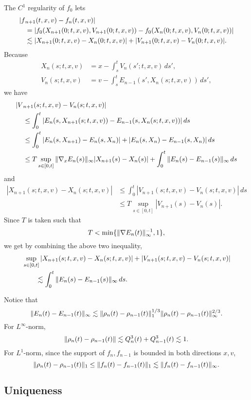 \documentclass[11pt]{amsart}
\begin{document}
\begin{pfs}
The $C^1$ regularity of $f_0$ lets
\begin{align*}
|f&_{n+1}(t,x,v)-f_n(t,x,v)|\\
&=|f_0(X_{n+1}(0;t,x,v),V_{n+1}(0;t,x,v))-f_0(X_n(0;t,x,v),V_n(0;t,x,v))|\\
&\lesssim|X_{n+1}(0;t,x,v)-X_n(0;t,x,v)|+|V_{n+1}(0;t,x,v)-V_n(0;t,x,v)|.
\end{align*}
Because
\begin{align*}
X_n(s;t,x,v)&=x-\int_s^tV_n(s';t,x,v)\,ds',\\
V_n(s;t,x,v)&=v-\int_s^tE_{n-1}(s',X_n(s;t,x,v))\,ds',
\end{align*}
we have
\begin{align*}
|V&_{n+1}(s;t,x,v)-V_n(s;t,x,v)|\\
&\le\int_0^t|E_n(s,X_{n+1}(s;t,x,v))-E_{n-1}(s,X_n(s;t,x,v))|\,ds\\
&\le\int_0^t|E_n(s,X_{n+1})-E_n(s,X_n)|+|E_n(s,X_n)-E_{n-1}(s,X_n)|\,ds\\
&\le T\sup_{s\in[0,t]}\|\nabla_xE_n(s)\|_\infty|X_{n+1}(s)-X_n(s)|+\int_0^t\|E_n(s)-E_{n-1}(s)\|_\infty\,ds
\end{align*}
and
\begin{align*}
|X_{n+1}(s;t,x,v)-X_n(s;t,x,v)|
&\le\int_0^t|V_{n+1}(s;t,x,v)-V_n(s;t,x,v)|\,ds\\
&\le T\sup_{s\in[0,t]}|V_{n+1}(s)-V_n(s)|.
\end{align*}
Since $T$ is taken such that
\[T<\min\{\|\nabla E_n(t)\|_\infty^{-1},1\},\]
we get by combining the above two inequality,
\begin{align*}
&\sup_{s\in[0,t]}|X_{n+1}(s;t,x,v)-X_n(s;t,x,v)|+|V_{n+1}(s;t,x,v)-V_n(s;t,x,v)|\\
&\qquad\lesssim\int_0^t\|E_n(s)-E_{n-1}(s)\|_\infty\,ds.
\end{align*}
\item
Notice that
\[\|E_n(t)-E_{n-1}(t)\|_\infty\lesssim\|\rho_n(t)-\rho_{n-1}(t)\|_1^{1/3}\|\rho_n(t)-\rho_{n-1}(t)\|_\infty^{2/3}.\]
For $L^\infty$-norm,
\[\|\rho_n(t)-\rho_{n-1}(t)\|\lesssim Q_n^3(t)+Q_{n-1}^3(t)\lesssim1.\]
For $L^1$-norm, since the support of $f_n,f_{n-1}$ is bounded in both directions $x,v$,
\[\|\rho_n(t)-\rho_{n-1}(t)\|_1\le\|f_n(t)-f_{n-1}(t)\|_1\lesssim\|f_n(t)-f_{n-1}(t)\|_\infty.\]
\end{pfs}


\subsection{Uniqueness}
\end{document}
